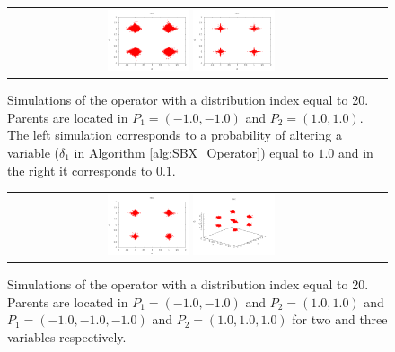\begin{figure}[t]
\centering
\begin{tabular}{cc}
   \includegraphics[width=0.23\textwidth]{img/Operadores/SBX_eta_20_2D_pv_1.png} 
   \includegraphics[width=0.23\textwidth]{img/Operadores/SBX_eta_20_2D_pv_01.png} 
\end{tabular}
\caption{Simulations of the \SBX{} operator with a distribution index equal to 20. Parents are located in $P_1=(-1.0, -1.0)$ and $P_2=(1.0, 1.0)$. The left simulation corresponds to a probability of altering a variable ($\delta_1$ in Algorithm \ref{alg:SBX_Operator}) equal to $1.0$ and in the right it corresponds to $0.1$.}
\label{fig:Simulation_pv}
\end{figure}



%
\begin{figure}[t]
\centering
\begin{tabular}{cc}
   \includegraphics[width=0.23\textwidth]{img/Operadores/SBX_eta_20_2D.png} 
   \includegraphics[width=0.23\textwidth]{img/Operadores/SBX_eta_20_3D.png} 
\end{tabular}
\caption{Simulations of the \SBX{} operator with a distribution index equal to 20. Parents are located in $P_1=(-1.0, -1.0)$ and $P_2=(1.0, 1.0)$ and $P_1=(-1.0, -1.0, -1.0)$ and $P_2=(1.0, 1.0, 1.0)$ for two and three variables respectively.}
\label{fig:Simulations_Index_20}
\end{figure}


